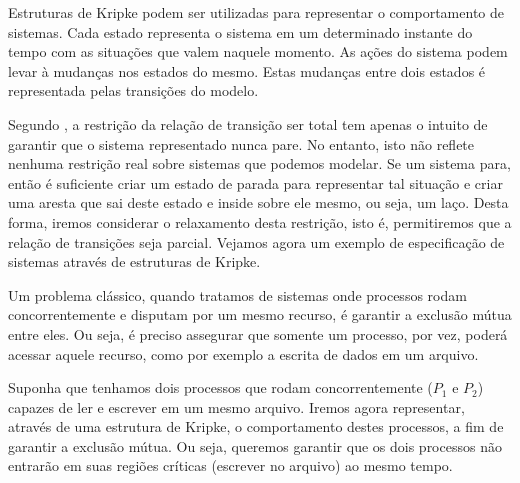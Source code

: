 \documentclass[normaltoc,capchap,capsec,times]{abnt}
\begin{document}

Estruturas de Kripke podem ser utilizadas para representar o comportamento de sistemas. Cada estado representa o sistema em um determinado instante do tempo com as situações que valem naquele momento. As ações do sistema podem levar à mudanças nos estados do mesmo. Estas mudanças entre dois estados é representada pelas transições do modelo. 

Segundo \cite{huth}, a restrição da relação de transição ser total tem apenas o intuito de garantir que o sistema representado nunca pare. No entanto, isto não reflete nenhuma restrição real sobre sistemas que podemos modelar. Se um sistema para, então é suficiente criar um estado de parada  para representar tal situação e criar uma aresta que sai deste estado e inside sobre  ele mesmo, ou seja, um laço. Desta forma, iremos considerar o relaxamento desta restrição, isto é, permitiremos que a relação de transições seja parcial. Vejamos agora um exemplo de especificação de sistemas através de estruturas de Kripke. 

Um problema clássico, quando tratamos de sistemas onde processos rodam concorrentemente e disputam por um mesmo recurso, é garantir a exclusão mútua entre eles. Ou seja, é preciso assegurar que somente um processo, por vez, poderá acessar aquele recurso, como por exemplo a escrita de dados em um arquivo.

Suponha que tenhamos dois processos que rodam concorrentemente ($P_1$ e $P_2$) capazes de ler e escrever em um mesmo arquivo. Iremos agora representar, através de uma estrutura de Kripke, o comportamento destes processos, a fim de garantir a exclusão mútua. Ou seja, queremos garantir que os dois processos não entrarão em suas regiões críticas (escrever no arquivo) ao mesmo tempo. 
\end{document}
